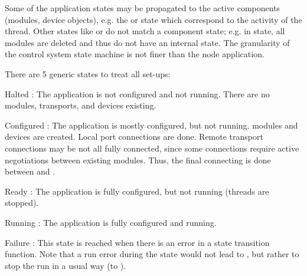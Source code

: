 Some of the application states may be propagated to the 
      active components (modules, device objects), e.g. the 
       or  state which correspond to the activity of the thread. 
      Other states like  or  do not match a component state; 
      e.g. in  state, all modules are deleted and thus do not 
      have an internal state. The granularity of the control system state 
      machine is not finer than the node application.

There are 5 generic states to treat all set-ups: 
\begin{compactdesc}
\item[Halted] : The application is not configured and not running. 
	 There are no modules, transports, and devices existing.
\item[Configured] : The application is mostly configured, but not running. 
	 modules and devices are created. Local port connections are done.
	  Remote transport connections may be not all fully connected, 
	  since some connections require active negotiations between existing 
	  modules. Thus, the final connecting is done between 
	   and .  
\item[Ready] : The application is fully configured, but not running 
	 (threads are stopped).
\item[Running] : The application is fully configured and running.
\item[Failure] : This state is reached when there is an error in a 
	 state transition function. Note that a run error during the 
	  state would not lead to , but rather to stop 
	 the run in a usual way (to ).
\end{compactdesc}

